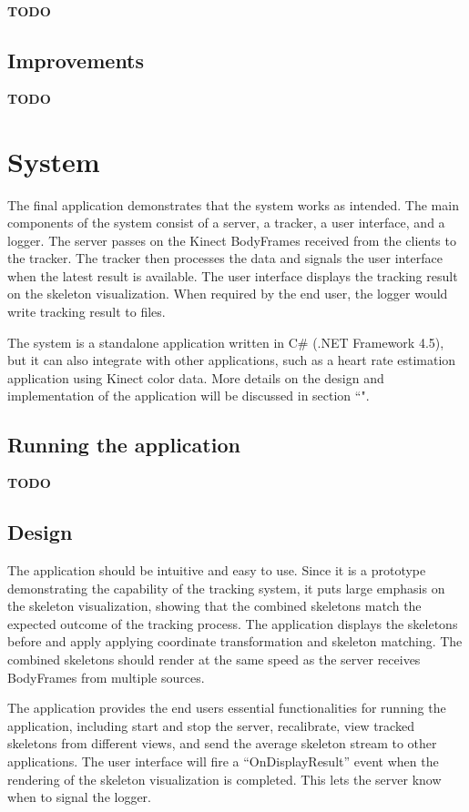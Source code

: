 \documentclass{sigchi}
\begin{document}
\textbf{TODO}

\subsection{Improvements}

\textbf{TODO}

\section{System}
\label{sec:system}

The final application demonstrates that the system works as intended. The main components of the system consist of a server, a tracker, a user interface, and a logger. The server passes on the Kinect BodyFrames received from the clients to the tracker. The tracker then processes the data and signals the user interface when the latest result is available. The user interface displays the tracking result on the skeleton visualization. When required by the end user, the logger would write tracking result to files.

The system is a standalone application written in C\# (.NET Framework 4.5), but it can also integrate with other applications, such as a heart rate estimation application using Kinect color data. More details on the design and implementation of the application will be discussed in section ``".

\subsection{Running the application}

\textbf{TODO}

\subsection{Design}

The application should be intuitive and easy to use. Since it is a prototype demonstrating the capability of the tracking system, it puts large emphasis on the skeleton visualization, showing that the combined skeletons match the expected outcome of the tracking process. The application displays the skeletons before and apply applying coordinate transformation and skeleton matching. The combined skeletons should render at the same speed as the server receives BodyFrames from multiple sources. 

The application provides the end users essential functionalities for running the application, including start and stop the server, recalibrate, view tracked skeletons from different views, and send the average skeleton stream to other applications. The user interface will fire a ``OnDisplayResult'' event when the rendering of the skeleton visualization is completed. This lets the server know when to signal the logger.
\end{document}
